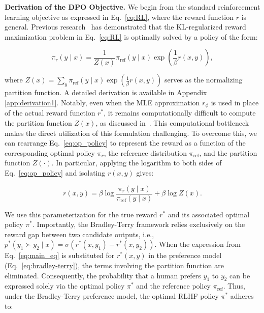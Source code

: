 \textbf{Derivation of the DPO Objective.} We begin from the standard reinforcement learning objective as expressed in Eq.~\ref{eq:RL}, where the reward function $r$ is general. Previous research~\citep{peters2007reinforcement, peng2019advantage, korbak2022reinforcement, go2023aligning} has demonstrated that the KL-regularized reward maximization problem in Eq.~\ref{eq:RL} is optimally solved by a policy of the form:

\begin{equation}\label{eq:op_policy}
    \pi_r(y\mid x) = \frac{1}{Z(x)}\pi_\text{ref}(y\mid x)\exp\left(\frac{1}{\beta}r(x, y)\right),
\end{equation}

where $Z(x) =\sum_{y}\pi_\text{ref}(y\mid x)\exp\left(\frac{1}{\beta}r(x, y)\right)$ serves as the normalizing partition function. A detailed derivation is available in Appendix \ref{app:derivation1}. Notably, even when the MLE approximation $r_{\phi}$ is used in place of the actual reward function $r^*$, it remains computationally difficult to compute the partition function $Z(x)$, as discussed in~\citep{korbak2022reinforcement, go2023aligning}. This computational bottleneck makes the direct utilization of this formulation challenging. To overcome this, we can rearrange Eq.~\ref{eq:op_policy} to represent the reward as a function of the corresponding optimal policy $\pi_r$, the reference distribution $\pi_\text{ref}$, and the partition function $Z(\cdot)$. In particular, applying the logarithm to both sides of Eq.~\ref{eq:op_policy} and isolating $r(x,y)$ gives:

\begin{equation}\label{eq:main_eq}
    r(x,y) =\beta \log \frac{\pi_r(y\mid x)}{\pi_\text{ref}(y\mid x)} + \beta \log Z(x).
\end{equation}

We use this parameterization for the true reward $r^*$ and its associated optimal policy $\pi^*$. Importantly, the Bradley-Terry framework relies exclusively on the reward gap between two candidate outputs, i.e., ${p^*(y_1 \succ y_2 \mid x) = \sigma(r^*(x, y_1) - r^*(x, y_2))}$. When the expression from Eq.~\ref{eq:main_eq} is substituted for $r^*(x,y)$ in the preference model (Eq.~\ref{eq:bradley-terry}), the terms involving the partition function are eliminated. Consequently, the probability that a human prefers $y_1$ to $y_2$ can be expressed solely via the optimal policy $\pi^*$ and the reference policy $\pi_\text{ref}$. Thus, under the Bradley-Terry preference model, the optimal RLHF policy $\pi^*$ adheres to:

